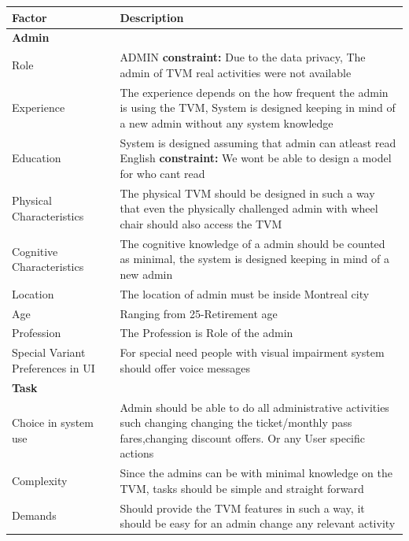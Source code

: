 \documentclass[a4paper,12pt]{report}
\begin{document}
\setlength{\tabcolsep}{18pt}
\renewcommand{\arraystretch}{1.5}
\begin{tabular}[H]{ |p{3cm}|p{12cm}| }
	\hline
	\textbf{Factor}  & \textbf{Description}  \\
	\hline
	\textbf{Admin} &   \\
	\hline
	Role &
	ADMIN \textbf{constraint:} Due to the data privacy, The admin of TVM real activities were not available
	\\
	\hline
	Experience & 
	The experience depends on the how frequent the admin is using the TVM, System is designed keeping in mind of a new admin without any system knowledge
	\\
	\hline
	Education &
	System is designed assuming that admin can atleast read English \textbf{constraint:} We wont be able to design a model for who cant read
	\\
	\hline
	Physical Characteristics    &
	The physical TVM should be designed in such a way that even the physically challenged admin with wheel chair should also access the TVM
	\\
	\hline
	Cognitive Characteristics & 
	The cognitive knowledge of a admin should be counted as minimal, the system is designed keeping in mind of a new admin
	\\
	\hline
	Location & 
	The location of admin must be inside Montreal city
	\\
	\hline
	Age & 
	Ranging from 25-Retirement age
	\\
	\hline
	Profession & 
	The Profession is Role of the admin
	\\
	\hline
	Special Variant Preferences in UI & 
	For special need people with visual impairment system should offer voice messages
	\\
	\hline
	\textbf{Task} &  \\
	\hline
	Choice in system use &
	Admin should be able to do all administrative activities such changing changing the ticket/monthly pass fares,changing discount offers. Or any User specific actions
	\\
	\hline
	Complexity & 
	Since the admins can be with minimal knowledge on the TVM, tasks should be simple and straight forward
	\\
	\hline
	Demands &
	Should provide the TVM features in such a way, it should be easy for an admin change any relevant activity 
	\\
	\hline 
\end{tabular}
\end{document}
